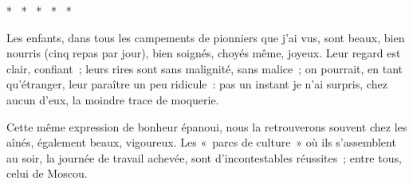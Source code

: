 \documentclass[french,twoside]{book} %
\begin{document}
\begin{center}
\noindent \centerline{*  *  *  *  *}\par
\end{center}

\noindent Les enfants, dans tous les campements de pionniers que j’ai vus, sont beaux, bien nourris (cinq repas par jour), bien soignés, choyés même, joyeux. Leur regard est clair, confiant ; leurs rires sont sans malignité, sans malice ; on pourrait, en tant qu’étranger, leur paraître un peu ridicule : pas un instant je n’ai surpris, chez aucun d’eux, la moindre trace de moquerie.\par
Cette même expression de bonheur épanoui, nous la retrouverons souvent chez les aînés, également beaux, vigoureux. Les « parcs de culture » où ils s’assemblent au soir, la journée de travail achevée, sont d’incontestables réussites ; entre tous, celui de Moscou.\par
\end{document}
